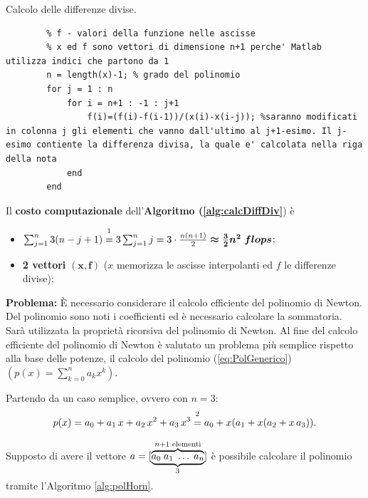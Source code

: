 \begin{algorithm}
\caption{Calcolo delle differenze divise.}\label{alg:calcDiffDiv}
    \begin{lstlisting}[style=Matlab-editor]
        % x - ascisse di interpolazione
        % f - valori della funzione nelle ascisse
        % x ed f sono vettori di dimensione n+1 perche' Matlab utilizza indici che partono da 1
        n = length(x)-1; % grado del polinomio
        for j = 1 : n
            for i = n+1 : -1 : j+1
                f(i)=(f(i)-f(i-1))/(x(i)-x(i-j)); %saranno modificati in colonna j gli elementi che vanno dall'ultimo al j+1-esimo. Il j-esimo contiente la differenza divisa, la quale e' calcolata nella riga della nota
            end
        end
    \end{lstlisting}
\end{algorithm}

\begin{remark} Il \textbf{costo computazionale} dell'\textbf{Algoritmo (\ref{alg:calcDiffDiv}}) è
    \begin{itemize}
        \item $\sum_{j=1}^{n}3(n-j+1)\overset{\footnotemark}{=} 3\sum_{j=1}^{n}j=3\cdot\frac{n(n+1)}{2}\boldsymbol{\approx \frac{3}{2}n^2\; flops}$; 
        \item \textbf{2 vettori} $\boldsymbol{(x, f)}$ ($x$ memorizza le ascisse interpolanti ed $f$ le differenze divise);
    \end{itemize}
\end{remark}

\noindent\textbf{Problema:} È necessario considerare il calcolo efficiente del polinomio di Newton. Del polinomio sono noti i coefficienti ed è necessario calcolare la sommatoria. Sarà utilizzata la proprietà ricorsiva del polinomio di Newton. Al fine del calcolo efficiente del polinomio di Newton è valutato un problema più semplice rispetto alla base delle potenze, il calcolo del polinomio (\ref{eq:PolGenerico})  $\left(p(x)=\sum_{k=0}^{n}a_kx^k\right)$.

Partendo da un caso semplice, ovvero con $n=3$:
\begin{equation*}
    p(x)=a_0+a_1\,x+a_2\,x^2+a_3\,x^3\overset{\footnotemark}{=} a_0+ x(a_1+x(a_2+x\,a_3)).
\end{equation*}

Supposto di avere il vettore $a=[\underbrace{\overbrace{a_0\; a_1\; \hdots\; a_n}^{n+1\text{ elementi}}}_{\footnotemark}]$  è possibile calcolare il polinomio tramite l'Algoritmo \ref{alg:polHorn}.

